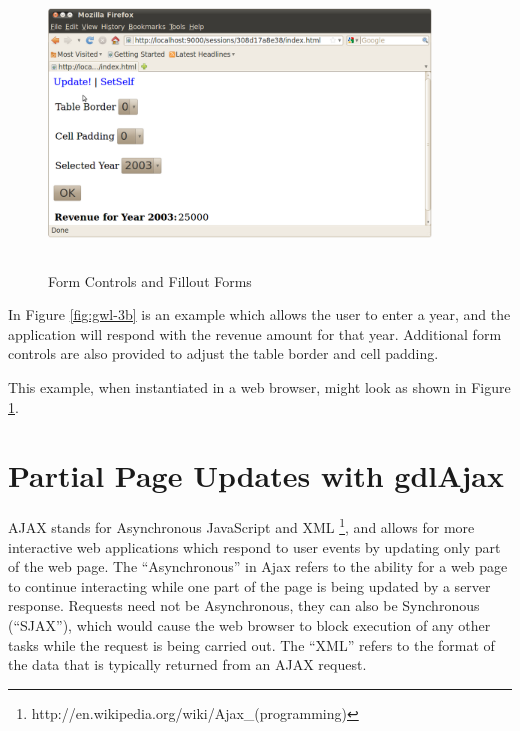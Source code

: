 \documentclass [11pt]{book}
\begin{document}
\begin{figure}
\begin{center}
\includegraphics[width=4in,height=3in]{../images/gwl-3b.png}
\end{center}

\caption{Form Controls and Fillout Forms}

\label{fig:gwl-3b-image}

\end{figure}


In Figure 
\ref{fig:gwl-3b} is an example which allows the user to enter a year, and the 
application will respond with the revenue amount for that year. Additional
form controls are also provided to adjust the table border and cell padding.



This example, when instantiated in a web browser, might look as shown in Figure 
\ref{fig:gwl-3b-image}.



\section{Partial Page Updates with gdlAjax}

\label{sec:partialpageupdateswithgdlajax}



AJAX stands for Asynchronous JavaScript and
XML \footnote{http://en.wikipedia.org/wiki/Ajax\_(programming)}, and allows for more interactive web applications which
respond to user events by updating only part of the web page. The
``Asynchronous'' in Ajax refers to the ability for a web page to
continue interacting while one part of the page is being updated by a
server response. Requests need not be Asynchronous, they can also be
Synchronous (``SJAX''), which would cause the web browser to block
execution of any other tasks while the request is being carried
out. The ``XML'' refers to the format of the data that is typically
returned from an AJAX request.
\end{document}
